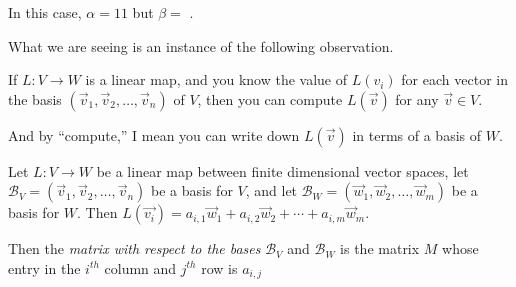 \documentclass{ximera}
\begin{document}
\begin{question}
\begin{solution}
      In this case, $\alpha = 11$ but $\beta =$ .
    \end{solution}

    What we are seeing is an instance of the following observation.

    \begin{observation}
      If $L:V \to W$ is a linear map, and you know the value of $L(v_i)$ for each vector in the basis $(\vec{v}_1,\vec{v}_2,\ldots,\vec{v}_n)$ of $V$, 
      then you can compute $L(\vec{v})$ for any $\vec{v} \in V$.

      And by ``compute,'' I mean you can write down $L(\vec{v})$ in terms of a basis of $W$.
    \end{observation}

\end{question}

\begin{definition}
  Let $L:V \to W$ be a linear map between finite dimensional vector
  spaces, let $\mathcal{B}_V =(\vec{v}_1 ,\vec{v}_2,\ldots,\vec{v}_n) $
  be a basis for $V$, and let $\mathcal{B}_W =
  (\vec{w}_1,\vec{w}_2,\ldots,\vec{w}_m)$ be a basis for $W$.  Then
  $L(\vec{v_i}) = a_{i,1}\vec{w}_1+a_{i,2}\vec{w}_2 + \cdots +
  a_{i,m}\vec{w}_m$.

  Then the \textit{matrix with respect to the bases} $\mathcal{B}_V$
  and $\mathcal{B}_W$ is the matrix $M$ whose entry in the $i^{th}$
  column and $j^{th}$ row is $a_{i,j}$
\end{definition}
\end{document}

